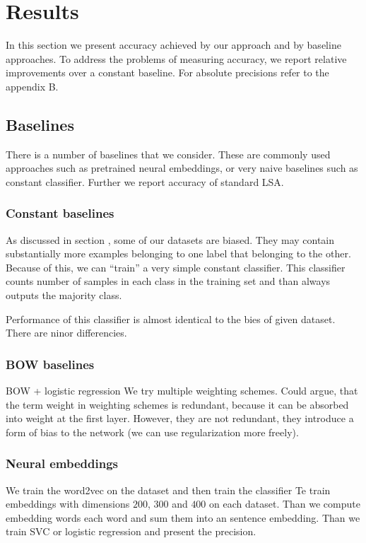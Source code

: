 \section{Results}
    In this section we present accuracy achieved by our approach and by baseline approaches.
    To address the problems of measuring accuracy, we report relative improvements over a constant baseline.
    For absolute precisions refer to the appendix B. 

    \subsection{Baselines} \label{sec:baseline}

    There is a number of baselines that we consider.
    These are commonly used approaches such as pretrained neural embeddings, or very naive baselines such as constant classifier.
    Further we report accuracy of standard LSA.

    \subsubsection{Constant baselines}
    As discussed in section \label{sec:data:overview}, some of our datasets are biased. 
    They may contain substantially more examples belonging to one label that belonging to the other.
    Because of this, we can ``train'' a very simple constant classifier. 
    This classifier counts number of samples in each class in the training set and than always outputs the majority class.
    
    Performance of this classifier is almost identical to the bies of given dataset. 
    There are ninor differencies. 
    
    \subsubsection{BOW baselines}    
    BOW + logistic regression
    We try multiple weighting schemes.
    Could argue, that the term weight in weighting schemes is redundant, because it can be absorbed into weight at the first layer.
    However, they are not redundant, they introduce a form of bias to the network (we can use regularization more freely).


    \subsubsection{Neural embeddings}    
    We train the word2vec on the dataset and then train the classifier
    Te train embeddings with dimensions $200$, $300$ and $400$ on each dataset. 
    Than we compute embedding words each word and sum them into an sentence embedding.
    Than we train SVC or logistic regression and present the precision.

